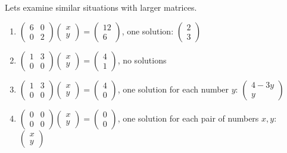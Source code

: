 Lets examine similar situations with larger matrices.
\begin{enumerate}
\item
$\begin{pmatrix}
6	&0 	\\
0 	&2 	
\end{pmatrix} 
\begin{pmatrix}
 x \\ 
y 
\end{pmatrix} 
=
\begin{pmatrix}
12 \\ 
6
\end{pmatrix}$, one solution: 
$\begin{pmatrix}
2 \\ 
3
\end{pmatrix}$

\item 
$\begin{pmatrix}
1	&3 	\\
0 	&0 	
\end{pmatrix} 
\begin{pmatrix}
 x \\ 
y 
\end{pmatrix} 
=
\begin{pmatrix}
4 \\ 
1 
\end{pmatrix}$, no solutions

\item 
$\begin{pmatrix}
1	&3 	\\
0 	&0 	
\end{pmatrix} 
\begin{pmatrix}
 x \\ 
y 
\end{pmatrix} 
=
\begin{pmatrix}
4 \\ 
0
\end{pmatrix} $, one solution for each number $y$: 
$\begin{pmatrix}
4-3y \\ 
y
\end{pmatrix} $

\item 
$\begin{pmatrix}
0	&0 	\\
0 	&0 	
\end{pmatrix} 
\begin{pmatrix}
 x \\ 
y 
\end{pmatrix} 
=
\begin{pmatrix}
0 \\ 
0
\end{pmatrix} $, one solution for each pair of numbers $x,y$:
$\begin{pmatrix}
x\\ 
y
\end{pmatrix} $
\end{enumerate}
